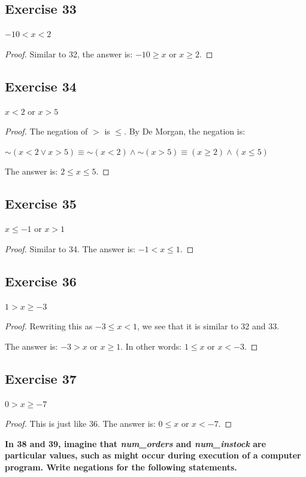 \documentclass[14pt]{extarticle}
\begin{document}
\subsection{Exercise 33}
$-10 < x < 2$

\begin{proof}
Similar to 32, the answer is: $-10 \geq x$ or $x \geq 2$.
\end{proof}

\subsection{Exercise 34}
$x < 2$ or $x > 5$

\begin{proof}
The negation of $>$ is $\leq$. By De Morgan, the negation is:

${\sim(x < 2 \vee x > 5)} \equiv {\sim (x < 2)} \wedge {\sim (x > 5)} \equiv (x \geq 2) \wedge (x \leq 5)$

The answer is: $2 \leq x \leq 5$.
\end{proof}

\subsection{Exercise 35}
$x \leq -1$ or $x > 1$

\begin{proof}
Similar to 34. The answer is: $-1 < x \leq 1$.
\end{proof}

\subsection{Exercise 36}
$1 > x \geq -3$

\begin{proof}
Rewriting this as $-3 \leq x < 1$, we see that it is similar to 32 and 33.

The answer is: $-3 > x$ or $x \geq 1$. In other words: $1 \leq x$ or $x < -3$.
\end{proof}

\subsection{Exercise 37}
$0 > x \geq -7$

\begin{proof}
This is just like 36. The answer is: $0 \leq x$ or $x < -7$.
\end{proof}

{\bf In 38 and 39, imagine that {\it num\_orders} and {\it num\_instock} are particular values, such as might occur during execution of a computer program. Write negations for the following statements.}
\end{document}
